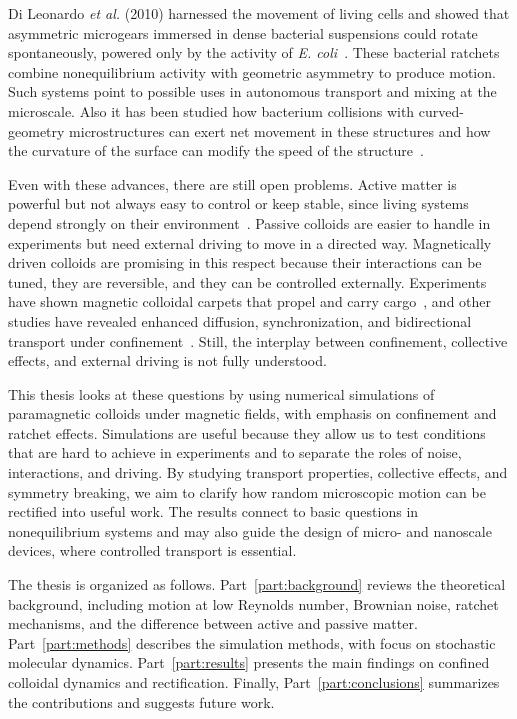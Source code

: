 Di Leonardo \textit{et al.} (2010) harnessed the movement of living cells and showed that asymmetric microgears immersed in dense bacterial suspensions could rotate spontaneously, powered only by the activity of \textit{E. coli}~\cite{di2010bacterial}. These bacterial ratchets combine nonequilibrium activity with geometric asymmetry to produce motion. Such systems point to possible uses in autonomous transport and mixing at the microscale. Also it has been studied how bacterium collisions with curved-geometry microstructures can exert net movement in these structures and how the curvature of the surface can modify the speed of the structure~\cite{pellicciotta2025wall}.

Even with these advances, there are still open problems. Active matter is powerful but not always easy to control or keep stable, since living systems depend strongly on their environment~\cite{bechinger2016active}. Passive colloids are easier to handle in experiments but need external driving to move in a directed way. Magnetically driven colloids are promising in this respect because their interactions can be tuned, they are reversible, and they can be controlled externally. Experiments have shown magnetic colloidal carpets that propel and carry cargo~\cite{martinez2015magnetic}, and other studies have revealed enhanced diffusion, synchronization, and bidirectional transport under confinement~\cite{tierno2012depinning, straube2014tunable, ostinato2024magnetically}. Still, the interplay between confinement, collective effects, and external driving is not fully understood.

This thesis looks at these questions by using numerical simulations of paramagnetic colloids under magnetic fields, with emphasis on confinement and ratchet effects. Simulations are useful because they allow us to test conditions that are hard to achieve in experiments and to separate the roles of noise, interactions, and driving. By studying transport properties, collective effects, and symmetry breaking, we aim to clarify how random microscopic motion can be rectified into useful work. The results connect to basic questions in nonequilibrium systems and may also guide the design of micro- and nanoscale devices, where controlled transport is essential.

The thesis is organized as follows. Part~\ref{part:background} reviews the theoretical background, including motion at low Reynolds number, Brownian noise, ratchet mechanisms, and the difference between active and passive matter. Part~\ref{part:methods} describes the simulation methods, with focus on stochastic molecular dynamics. Part~\ref{part:results} presents the main findings on confined colloidal dynamics and rectification. Finally, Part~\ref{part:conclusions} summarizes the contributions and suggests future work.

\newpage
